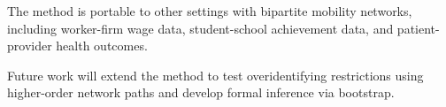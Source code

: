 \documentclass[9pt,twocolumn,twoside]{pnas-new}
\begin{document}

The method is portable to other settings with bipartite mobility networks, including worker-firm wage data, student-school achievement data, and patient-provider health outcomes. 

Future work will extend the method to test overidentifying restrictions using higher-order network paths and develop formal inference via bootstrap.
\end{document}
